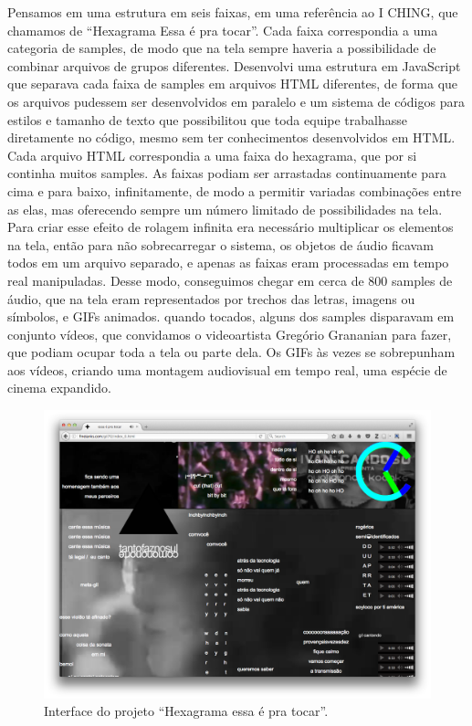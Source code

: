 Pensamos em uma estrutura em seis faixas, em uma referência ao I CHING, que chamamos de ``Hexagrama Essa é pra tocar''.  Cada faixa correspondia a uma categoria de samples, de modo que na tela sempre haveria a possibilidade de combinar arquivos de grupos diferentes. Desenvolvi uma estrutura em JavaScript que separava cada faixa de samples em arquivos HTML diferentes, de forma que os arquivos pudessem ser desenvolvidos em paralelo e um sistema de códigos para estilos e tamanho de texto que possibilitou que toda equipe trabalhasse diretamente no código, mesmo sem ter conhecimentos desenvolvidos em HTML. 
Cada arquivo HTML correspondia a uma faixa do hexagrama, que por si continha muitos samples. As faixas podiam ser arrastadas continuamente para cima e para baixo, infinitamente, de modo a permitir variadas combinações entre as elas, mas oferecendo sempre um número limitado de possibilidades na tela. Para criar esse efeito de rolagem infinita era necessário multiplicar os elementos na tela, então para não sobrecarregar o sistema, os objetos de áudio ficavam todos em um arquivo separado, e apenas as faixas eram processadas em tempo real manipuladas. 
Desse modo, conseguimos chegar em cerca de 800 samples de áudio, que na tela eram representados por trechos das letras, imagens ou símbolos, e GIFs animados. quando tocados, alguns dos samples disparavam em conjunto vídeos, que convidamos o videoartista Gregório Grananian para fazer, que podiam ocupar toda a tela ou parte dela. Os GIFs às vezes se sobrepunham aos vídeos,  criando uma montagem audiovisual em tempo real, uma espécie de cinema expandido. 

\begin{figure}
\centering
\includegraphics[width=1\textwidth]{pictures/cap1/gil701}
\caption{Interface do projeto ``Hexagrama essa é pra tocar''.}
\label{fig:gil701}
\end{figure}

